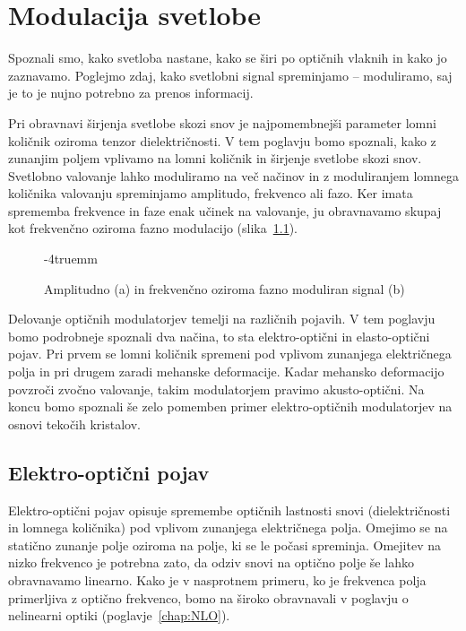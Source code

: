 
\chapter{Modulacija svetlobe}
\label{chap:modulacija}
Spoznali smo, kako svetloba nastane, kako se širi po optičnih vlaknih in kako
jo zaznavamo. Poglejmo zdaj, kako svetlobni signal spreminjamo -- moduliramo, saj je to
je nujno potrebno za prenos informacij. 

Pri obravnavi širjenja svetlobe skozi snov je najpomembnejši parameter lomni količnik
oziroma tenzor dielektričnosti. V tem poglavju bomo spoznali, kako z zunanjim poljem vplivamo 
na lomni količnik in širjenje svetlobe skozi snov. Svetlobno 
valovanje lahko moduliramo na več načinov in z moduliranjem
lomnega količnika valovanju spreminjamo amplitudo, 
frekvenco ali fazo. Ker imata sprememba frekvence in faze enak učinek na valovanje, ju obravnavamo
skupaj kot frekvenčno oziroma fazno modulacijo
 (slika~\ref{fig:amfm}). 
\begin{figure}[ht]
\centering
\def\svgwidth{120truemm} 

\caption{Amplitudno (a) in frekvenčno oziroma fazno moduliran signal (b)}
\label{fig:amfm}
\vglue-4truemm
\end{figure}

Delovanje optičnih modulatorjev temelji na različnih pojavih. V tem poglavju bomo 
podrobneje spoznali dva načina, to sta elektro-optični in elasto-optični pojav. 
Pri prvem se lomni količnik spremeni pod vplivom zunanjega električnega polja in
pri drugem zaradi mehanske deformacije. Kadar mehansko deformacijo povzroči zvočno valovanje, 
takim modulatorjem pravimo akusto-optični. Na koncu bomo spoznali še zelo pomemben 
primer elektro-optičnih modulatorjev na osnovi tekočih kristalov.

\section{Elektro-optični pojav}
\label{chap:EO}
Elektro-optični pojav opisuje spremembe optičnih lastnosti 
snovi (dielektričnosti in lomnega količnika) pod vplivom 
zunanjega električnega polja. Omejimo se na statično zunanje polje oziroma
na polje, ki se le počasi spreminja. Omejitev na nizko 
frekvenco je potrebna zato, da odziv snovi na optično polje še lahko obravnavamo linearno. 
Kako je v nasprotnem primeru, ko je frekvenca polja primerljiva z optično frekvenco, 
bomo na široko obravnavali v poglavju o nelinearni optiki (poglavje~\ref{chap:NLO}).

